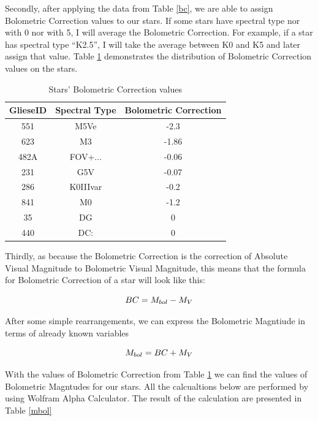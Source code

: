 \documentclass{article}
\begin{document}
  Secondly, after applying the data from Table \ref{bc}, we are able to assign Bolometric Correction values to our stars. If some stars have spectral type nor with 0 nor with 5, I will average the Bolometric Correction. For example, if a star has spectral type ``K2.5'', I will take the average between K0 and K5 and later assign that value. Table \ref{bcv} demonstrates the distribution of Bolometric Correction values on the stars.\\


\begin{table}[h]
    \begin{center}
      \caption{Stars' Bolometric Correction values}
      \begin{tabular}{c | c | c}
        \textbf{GlieseID} & \textbf{Spectral Type} & \textbf{Bolometric Correction}\\
        \hline
        551  & M5Ve     & -2.3\\
        623  & M3       & -1.86\\
        482A & FOV+...  & -0.06\\
        231  & G5V      & -0.07\\
        286  & K0IIIvar & -0.2\\
        841  & M0       & -1.2\\
        35   & DG       & 0\\
        440  & DC:      & 0\\
      \end{tabular}
      \label{bcv}
    \end{center}
  \end{table}
  
  Thirdly, as because the Bolometric Correction is the correction of Absolute Visual Magnitude to Bolometric Visual Magnitude, this means that the formula for Bolometric Correction of a star will look like this:

  \begin{equation}
    BC = M_{bol} - M_V\\
    \end{equation}

  After some simple rearrangements, we can express the Bolometric Magntiude in terms of already known variables

  \begin{equation}
    M_{bol} = BC + M_V\\
    \end{equation}

  With the values of Bolometric Correction from Table \ref{bcv} we can find the values of Bolometric Magntudes for our stars. All the calcualtions below are performed by using Wolfram Alpha Calculator. The result of the calculation are presented in Table \ref{mbol}\\
\end{document}
